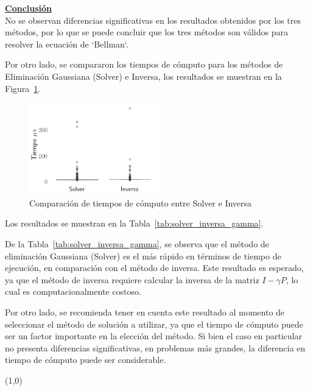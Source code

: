 \indent\underline{\textbf{Conclusión}}\\
No se observan diferencias significativas en los resultados obtenidos por los tres métodos, por lo que se puede concluir que los tres métodos son válidos para resolver la ecuación de `Bellman`.

Por otro lado, se compararon los tiempos de cómputo para los métodos de Eliminación Gaussiana (Solver) e Inversa, los resultados se muestran en la Figura~\ref{fig:time_comparison}.

\begin{figure}[H]
    \centering
    \includegraphics[width=0.5\textwidth]{../img/solver_inversa_gamma}
    \caption{Comparación de tiempos de cómputo entre Solver e Inversa}
    \label{fig:time_comparison}
\end{figure}

Los resultados se muestran en la Tabla~\ref{tab:solver_inversa_gamma}.



De la Tabla~\ref{tab:solver_inversa_gamma}, se observa que el método de eliminación Gaussiana (Solver) es el más rápido en términos de tiempo de ejecución, en comparación con el método de inversa.
Este resultado es esperado, ya que el método de inversa requiere calcular la inversa de la matriz $I - \gamma P$, lo cual es computacionalmente costoso.

Por otro lado, se recomienda tener en cuenta este resultado al momento de seleccionar el método de solución a utilizar, ya que el tiempo de cómputo puede ser un factor importante en la elección del método.
Si bien el caso en particular no presenta diferencias significativas, en problemas más grandes, la diferencia en tiempo de cómputo puede ser considerable.

\line(1,0){\textwidth}
